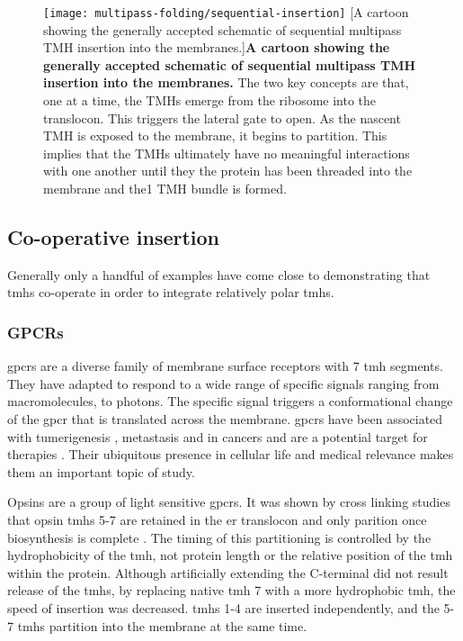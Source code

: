 \begin{figure}[!ht]
\centering
\texttt{[image: multipass-folding/sequential-insertion]}
        [A cartoon showing the generally accepted schematic of sequential multipass TMH insertion into the membranes.]{\textbf{A cartoon showing the generally accepted schematic of sequential multipass TMH insertion into the membranes.}
        The two key concepts are that, one at a time, the TMHs emerge from the ribosome into the translocon.
        This triggers the lateral gate to open.
        As the nascent TMH is exposed to the membrane, it begins to partition.
        This implies that the TMHs ultimately have no meaningful interactions with one another until they the protein has been threaded into the membrane and the1 TMH bundle is formed.
}
\label{fig:sequential-insertion}
\end{figure}

\subsection{Co-operative insertion}
Generally only a handful of examples have come close to demonstrating that \gls{tmh}s co-operate in order to integrate relatively polar \gls{tmh}s.

\subsubsection{GPCRs}

\gls{gpcr}s are a diverse family of membrane surface receptors with 7 \gls{tmh} segments.
They have adapted to respond to a wide range of specific signals ranging from macromolecules, to photons.
The specific signal triggers a conformational change of the \gls{gpcr} that is translated across the membrane.
\gls{gpcr}s have been associated with tumerigenesis \cite{OHayre2013}, metastasis \cite{Singh2015} and in cancers \cite{Bar-Shavit2016} and are a potential target for therapies \cite{Arakaki2018}.
Their ubiquitous presence in cellular life and medical relevance makes them an important topic of study.

Opsins are a group of light sensitive \gls{gpcr}s.
It was shown by cross linking studies that opsin \gls{tmh}s 5-7 are retained in the \gls{er} translocon and only parition once biosynthesis is complete \cite{Ismail2008}.
The timing of this partitioning is controlled by the hydrophobicity of the \gls{tmh}, not protein length or the relative position of the \gls{tmh} within the protein.
Although artificially extending the C-terminal did not result release of the \gls{tmh}s, by replacing native \gls{tmh} 7 with a more hydrophobic \gls{tmh}, the speed of insertion was decreased.
\gls{tmh}s 1-4 are inserted independently, and the 5-7 \gls{tmh}s partition into the membrane at the same time.


